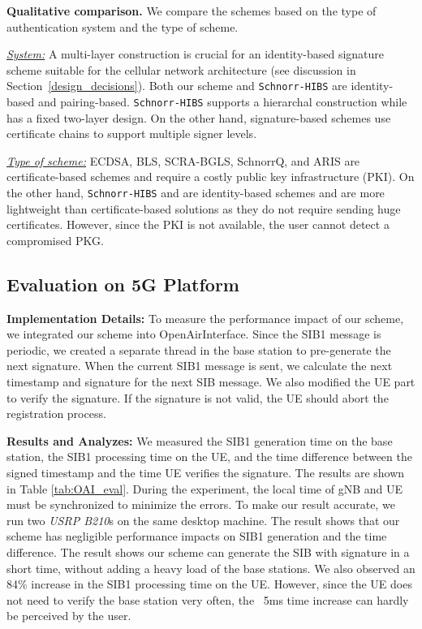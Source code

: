 \noindent \textbf{Qualitative comparison.}
We compare the schemes based on the type of authentication system and the type of scheme.

\noindent \textit{\underline{System:}} A multi-layer construction is crucial for an identity-based signature scheme suitable for the cellular network architecture (see discussion in Section~\ref{design_decisions}). Both our scheme and \texttt{Schnorr-HIBS} are identity-based and pairing-based. \texttt{Schnorr-HIBS} supports a hierarchal construction while \scheme{} has a fixed two-layer design. On the other hand, signature-based schemes use certificate chains to support multiple signer levels. 

\noindent \textit{\underline{Type of scheme:}} ECDSA, BLS, SCRA-BGLS, SchnorrQ, and ARIS are certificate-based schemes and require a costly public key infrastructure (PKI). On the other hand, \texttt{Schnorr-HIBS} and \scheme{} are identity-based schemes and are more lightweight than certificate-based solutions as they do not require sending huge certificates. However, since the PKI is not available, the user cannot detect a compromised PKG. 

\subsection{Evaluation on 5G Platform}
\noindent \textbf{Implementation Details:}
To measure the performance impact of our scheme, we integrated our scheme into OpenAirInterface. Since the SIB1 message is periodic, we created a separate thread in the base station to pre-generate the next signature. When the current SIB1 message is sent, we calculate the next timestamp and signature for the next SIB message. We also modified the UE part to verify the signature. If the signature is not valid, the UE should abort the registration process. 

\noindent \textbf{Results and Analyzes:}
We measured the SIB1 generation time on the base station, the SIB1 processing time on the UE, and the time difference between the signed timestamp and the time UE verifies the signature. The results are shown in Table \ref{tab:OAI_eval}. During the experiment, the local time of gNB and UE must be synchronized to minimize the errors. To make our result accurate, we run two \textit{USRP B210}s on the same desktop machine. The result shows that our scheme has negligible performance impacts on SIB1 generation and the time difference. The result shows our scheme can generate the SIB with signature in a short time, without adding a heavy load of the base stations. We also observed an 84\% increase in the SIB1 processing time on the UE. However, since the UE does not need to verify the base station very often, the ~5ms time increase can hardly be perceived by the user. 

